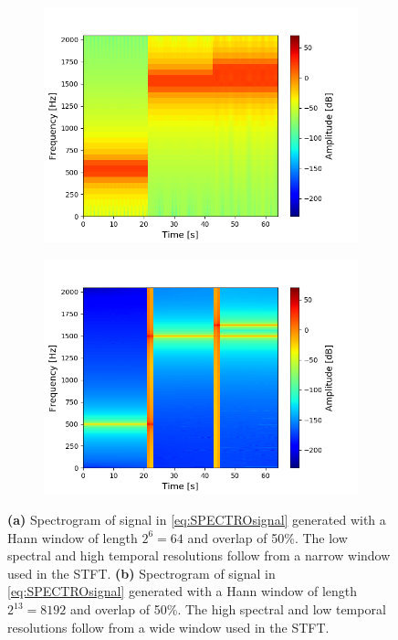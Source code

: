 \begin{figure}[H]
\centering
\begin{subfigure}{0.49\textwidth}
\centering
\includegraphics[width=\textwidth]{figures/validation/stft/1.png}
\caption{}
\label{fig:test_stft2}
\end{subfigure}
\begin{subfigure}{0.49\textwidth}
\centering
\includegraphics[width=\textwidth]{figures/validation/stft/2.png}
\caption{}
\label{fig:test_stft1}
\end{subfigure}
\caption{\textbf{(a)} Spectrogram of signal in \eqref{eq:SPECTROsignal} generated with a Hann window of length $2^6=64$ and overlap of 50\%. The low spectral and high temporal resolutions follow from a narrow window used in the STFT. \textbf{(b)} Spectrogram of signal in \eqref{eq:SPECTROsignal} generated with a Hann window of length $2^{13}=8192$ and overlap of 50\%. The high spectral and low temporal resolutions follow from a wide window used in the STFT.}
\label{fig:test_stft}
\end{figure}
